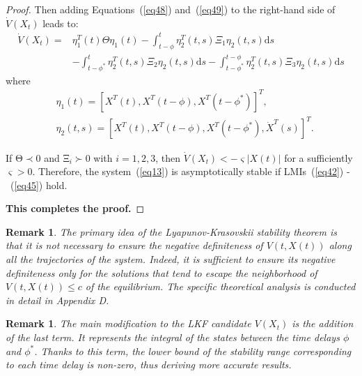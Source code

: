 \documentclass[journal]{IEEEtran}
\newtheorem{remark}[theorem]{Remark}
\begin{document}
\begin{proof}
  Then adding Equations~(\ref{eq48}) and~(\ref{eq49}) to the right-hand side of $\dot{V}\left(X_t\right)$ leads to:
  \begin{equation}
    \begin{aligned}
    \dot V\left( {{X_t}} \right) =& \eta _1^{T}(t)\Theta {\eta _1}(t) - \int_{t - \phi }^t {\eta _2^{T}} (t,s){\Xi _1}{\eta _2}(t,s){\text{d}}s \\
    & - \int_{t - {\phi ^*}}^t {\eta _2^{T}} (t,s){\Xi _2}{\eta _2}(t,s){\text{d}}s - \int_{t - {\phi ^*}}^{t - \phi } {\eta _2^{T}} (t,s){\Xi _3}{\eta _2}(t,s){\text{d}}s
    \end{aligned}
    \label{eq410}
  \end{equation}
  where
  \begin{equation*}
    \begin{aligned}
       & {\eta _1}(t) = {\left[ {{X^{T}}(t),{X^{T}}\left( {t - \phi } \right),{X^{T}}\left( {t - {\phi ^*}} \right)} \right]^{T}},                     \\
       & {\eta _2}(t,s) = {\left[ {{X^{T}}(t),{X^{T}}\left( {t - \phi } \right),{X^{T}}\left( {t - {\phi ^*}} \right),{{\dot X}^{T}}(s)} \right]^{T}}.
    \end{aligned}
  \end{equation*}

  If $\mathrm{\Theta} \prec 0$ and $\mathrm{\Xi}_i\succ0$ with $i=1,2,3$, then $\dot{V}\left(X_t\right)<-\varsigma\left|X(t)\right|$ for a sufficiently $\varsigma>0$. Therefore, the system~(\ref{eq13}) is asymptotically stable if LMIs~(\ref{eq42}) -~(\ref{eq45}) hold.

  \textbf{This completes the proof.}

\end{proof}

\begin{remark}
  \label{remarkdiff}
  The primary idea of the Lyapunov-Krasovskii stability theorem is that it is not necessary to ensure the negative definiteness of $V\left(t,X\left(t\right)\right)$ along all the trajectories of the system. Indeed, it is sufficient to ensure its negative definiteness only for the solutions that tend to escape the neighborhood of $V\left(t,X\left(t\right)\right)\le c$ of the equilibrium. The specific theoretical analysis is conducted in detail in Appendix D.
\end{remark}

\begin{remark}
  The main modification to the LKF candidate $V\left(X_t\right)$ is the addition of the last term. It represents the integral of the states between the time delays $\phi$ and $\phi^\ast$. Thanks to this term, the lower bound of the stability range corresponding to each time delay is non-zero, thus deriving more accurate results.
\end{remark}
\end{document}
